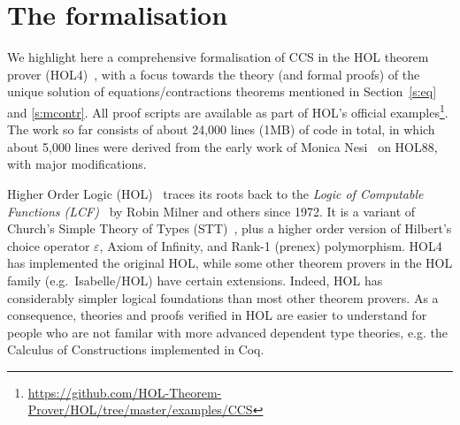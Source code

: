 
\newcommand\fun{{\to}}
\newcommand\prd{{\times}}
\newcommand{\ty}[1]{\textsl{#1}}
\newcommand\conj{\ \wedge\ }
\newcommand\disj{\ \vee\ }
\newcommand\imp{ \Rightarrow }
\newcommand\eqv{\ \equiv\ }
\newcommand\vbar{\mid}
\newcommand\turn{\ \vdash\ } %
\newcommand\hilbert{\varepsilon}
\newcommand{\uquant}[1]{\forall #1.\ }
\newcommand{\equant}[1]{\exists #1.\ }
\newcommand{\hquant}[1]{\hilbert #1.\ }
\newcommand{\iquant}[1]{\exists ! #1.\ }
\newcommand{\lquant}[1]{\lambda #1.\ }
\newcommand{\ml}[1]{\mbox{{\def\_{\char'137}\texttt{#1}}}}
\newcommand{\con}[1]{\mathrm{#1}}

\newcommand\bool{\ty{bool}}
\newcommand\num{\ty{num}}
\newcommand\ind{\ty{ind}}
\newcommand\lst{\ty{list}}

\providecommand{\T}{\con{T}}
\renewcommand{\T}{\con{T}}
\newcommand\F{\con{F}}
\newcommand\OneOne{\con{One\_One}}
\newcommand\OntoSubset{\con{Onto\_Subset}}
\newcommand\Onto{\con{Onto}}
\newcommand\TyDef{\con{Type\_Definition}}

\section{The formalisation}
\label{s:for}

We highlight here a comprehensive formalisation of CCS in the HOL theorem prover
(HOL4)~\cite{Melham:1993vl,slind2008brief}, with a focus towards the
theory (and formal proofs) of the unique solution of
equations/contractions theorems mentioned in Section~\ref{s:eq} and
\ref{s:mcontr}.
All proof scripts are available as part of HOL's official
examples\footnote{\url{https://github.com/HOL-Theorem-Prover/HOL/tree/master/examples/CCS}}.
The work so far consists of about 24,000 lines (1MB) of code in total,
in which about 5,000 lines were derived from the early work of Monica
Nesi~\cite{Nesi:1992ve} on HOL88, with major modifications.

Higher Order Logic (HOL)~\cite{hollogic} traces
its roots back to the
\emph{Logic of Computable Functions
  (LCF)}~\cite{gordon1979edinburgh,milner1972logic}
by Robin Milner and others
since 1972. It is a variant of
Church’s Simple Theory of Types (STT)~\cite{church1940formulation},
plus a higher order version of Hilbert's choice operator $\varepsilon$,
Axiom of Infinity, and Rank-1 (prenex) polymorphism.
HOL4 has implemented the original HOL, 
while some other theorem provers in the HOL family (e.g.~Isabelle/HOL) have
certain extensions.
Indeed, HOL has considerably simpler logical
foundations than most other theorem provers.
As a consequence, theories and proofs verified in HOL are easier to understand
 for people who are not familar with more advanced dependent type
 theories, e.g. the Calculus of Constructions implemented in Coq.

